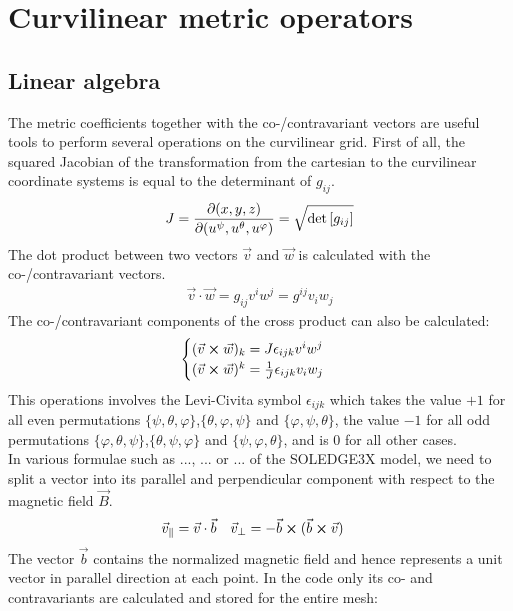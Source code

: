 \chapter{Curvilinear metric operators}
\label{app:CurvilinearMetric}



\section{Linear algebra}
\label{sec:app_linearAlgebra}

The metric coefficients together with the co-/contravariant vectors are useful tools to perform several operations on the curvilinear grid. First of all, the squared Jacobian of the transformation from the cartesian to the curvilinear coordinate systems is equal to the determinant of $g_{ij}$. 
\begin{align}
	J = \pdv{(x,y,z)}{(u^\psi, u^\theta, u^\varphi)} = \sqrt{\det\left[g_{ij}\right]} \label{eq:MetricJacobian}
\end{align}
The dot product between two vectors $\vec{v}$ and $\vec{w}$ is calculated with the co-/contravariant vectors.
\begin{align}
	\vec{v}\cdot\vec{w} = g_{ij}v^iw^j = g^{ij}v_iw_j \label{eq:MetricDotProduct}
\end{align}
The co-/contravariant components of the cross product can also be calculated: 
\begin{align}
	\begin{cases}
		(\vec{v} \cross \vec{w})_k = J\epsilon_{ijk}v^iw^j \\
		(\vec{v} \cross \vec{w})^k = \frac{1}{J}\epsilon_{ijk}v_iw_j
	\end{cases} \label{eq:MetricCrossProduct}
\end{align}
This operations involves the Levi-Civita symbol $\epsilon_{ijk}$ which takes the value $+1$ for all even permutations $\{\psi,\theta,\varphi\}$,$\{\theta,\varphi,\psi\}$ and $\{\varphi,\psi,\theta\}$, the value $-1$ for all odd permutations $\{\varphi,\theta,\psi\}$,$\{\theta,\psi,\varphi\}$ and $\{\psi,\varphi,\theta\}$, and is $0$ for all other cases. \\
In various formulae such as ..., ... or ... of the SOLEDGE3X model, we need to split a vector into its parallel and perpendicular component with respect to the magnetic field $\vec{B}$.
\begin{align}
	\vec{v}_\parallel &= \vec{v}\cdot\vec{b} & \vec{v}_\perp &= -\vec{b}\cross (\vec{b}\cross\vec{v}) \label{eq:MetricParalPerpVecComponents}
\end{align}
The vector $\vec{b}$ contains the normalized magnetic field and hence represents a unit vector in parallel direction at each point. In the code only its co- and contravariants are calculated and stored for the entire mesh: 

